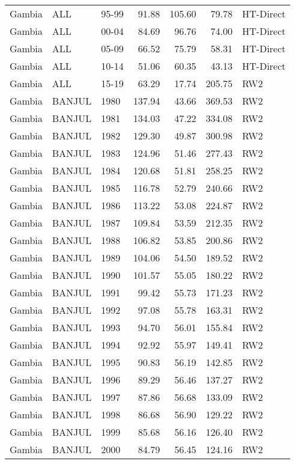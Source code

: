 \begin{longtable}{lllrrrl}
  Gambia & ALL & 95-99 & 91.88 & 105.60 & 79.78 & HT-Direct \\ 
  Gambia & ALL & 00-04 & 84.69 & 96.76 & 74.00 & HT-Direct \\ 
  Gambia & ALL & 05-09 & 66.52 & 75.79 & 58.31 & HT-Direct \\ 
  Gambia & ALL & 10-14 & 51.06 & 60.35 & 43.13 & HT-Direct \\ 
  Gambia & ALL & 15-19 & 63.29 & 17.74 & 205.75 & RW2 \\ 
  Gambia & BANJUL & 1980 & 137.94 & 43.66 & 369.53 & RW2 \\ 
  Gambia & BANJUL & 1981 & 134.03 & 47.22 & 334.08 & RW2 \\ 
  Gambia & BANJUL & 1982 & 129.30 & 49.87 & 300.98 & RW2 \\ 
  Gambia & BANJUL & 1983 & 124.96 & 51.46 & 277.43 & RW2 \\ 
  Gambia & BANJUL & 1984 & 120.68 & 51.81 & 258.25 & RW2 \\ 
  Gambia & BANJUL & 1985 & 116.78 & 52.79 & 240.66 & RW2 \\ 
  Gambia & BANJUL & 1986 & 113.22 & 53.08 & 224.87 & RW2 \\ 
  Gambia & BANJUL & 1987 & 109.84 & 53.59 & 212.35 & RW2 \\ 
  Gambia & BANJUL & 1988 & 106.82 & 53.85 & 200.86 & RW2 \\ 
  Gambia & BANJUL & 1989 & 104.06 & 54.50 & 189.52 & RW2 \\ 
  Gambia & BANJUL & 1990 & 101.57 & 55.05 & 180.22 & RW2 \\ 
  Gambia & BANJUL & 1991 & 99.42 & 55.73 & 171.23 & RW2 \\ 
  Gambia & BANJUL & 1992 & 97.08 & 55.78 & 163.31 & RW2 \\ 
  Gambia & BANJUL & 1993 & 94.70 & 56.01 & 155.84 & RW2 \\ 
  Gambia & BANJUL & 1994 & 92.92 & 55.97 & 149.41 & RW2 \\ 
  Gambia & BANJUL & 1995 & 90.83 & 56.19 & 142.85 & RW2 \\ 
  Gambia & BANJUL & 1996 & 89.29 & 56.46 & 137.27 & RW2 \\ 
  Gambia & BANJUL & 1997 & 87.86 & 56.68 & 133.09 & RW2 \\ 
  Gambia & BANJUL & 1998 & 86.68 & 56.90 & 129.22 & RW2 \\ 
  Gambia & BANJUL & 1999 & 85.68 & 56.16 & 126.40 & RW2 \\ 
  Gambia & BANJUL & 2000 & 84.79 & 56.45 & 124.16 & RW2 \\ 

\end{longtable}

